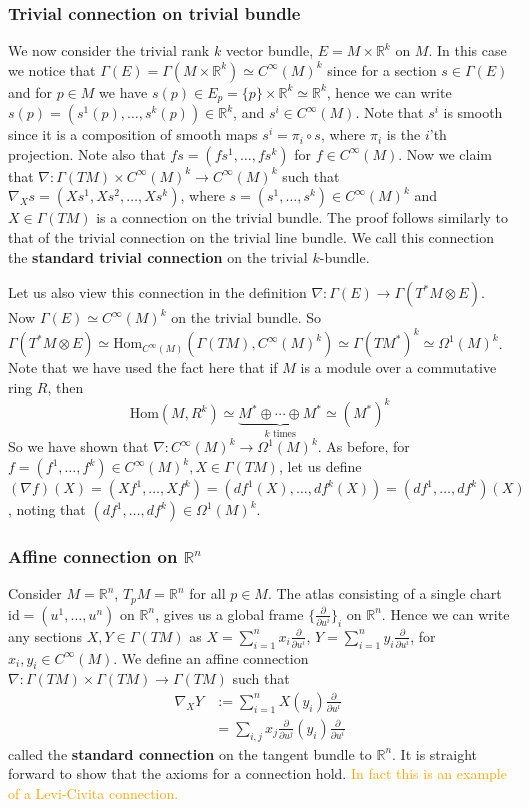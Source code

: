 \documentclass[a4paper]{article}
\theoremstyle{definition} \newtheorem*{definition}{Definition}
\theoremstyle{definition} \newtheorem*{definitions}{Definitions}
\theoremstyle{plain} \newtheorem{theorem}{Theorem}[section]
\theoremstyle{plain} \newtheorem{proposition}[theorem]{Proposition}
\theoremstyle{plain} \newtheorem{corollary}[theorem]{Corollary}
\theoremstyle{plain} \newtheorem{lemma}[theorem]{Lemma}
\theoremstyle{plain} \newtheorem{example}[theorem]{Example}
\newcommand{\understandBetter}[1]{\textcolor{orange}{#1}}
\newcommand{\defn}[1]{\textbf{#1}}
\newcommand{\realnos}{\mathbb{R}}
\newcommand{\Hom}{\text{Hom}}
\newcommand{\smooth}{C^\infty}
\begin{document}
\subsubsection{Trivial connection on trivial bundle}
We now consider the trivial rank $k$ vector bundle, $E=M\times \realnos^k$ on $M$. In this case we notice that $\Gamma(E)=\Gamma(M\times \realnos^k)\simeq \smooth (M)^k$ since for a section $s\in \Gamma(E)$ and for $p\in M$ we have $s(p)\in E_p=\{p\}\times \realnos^k\simeq \realnos^k$, hence we can write $s(p)=(s^1(p),\ldots, s^k(p))\in \realnos^k$, and $s^i\in \smooth(M)$. Note that $s^i$ is smooth since it is a composition of smooth maps $s^i=\pi_i\circ s$, where $\pi_i$ is the $i$'th projection. Note also that $fs=(fs^1, \ldots, fs^k)$ for $f\in \smooth(M)$. Now we claim that $\nabla:\Gamma(TM)\times \smooth(M)^k\to \smooth(M)^k$ such that $\nabla_X s = (Xs^1, Xs^2, \ldots, Xs^k)$, where $s=(s^1, \ldots, s^k)\in \smooth (M)^k$ and $X\in \Gamma(TM)$ is a connection on the trivial bundle. The proof follows similarly to that of the trivial connection on the trivial line bundle. We call this connection the \defn{standard trivial connection} on the trivial $k$-bundle. 

Let us also view this connection in the definition $\nabla:\Gamma(E)\to \Gamma(T^*M\otimes E)$. Now $\Gamma(E)\simeq \smooth(M)^k$ on the trivial bundle. So  $\Gamma(T^*M\otimes E)\simeq \Hom_{\smooth(M)}(\Gamma(TM), \smooth(M)^k)\simeq \Gamma(TM^*)^k \simeq \Omega^1(M)^k$. Note that we have used the fact here that if $M$ is a module over a commutative ring $R$, then 
$$\Hom(M, R^k)\simeq \underbrace{M^*\oplus \cdots \oplus M^*}_{k \text{ times}} \simeq (M^*)^{k}$$
So we have shown that $\nabla:\smooth(M)^k\to \Omega^1(M)^k$. As before, for $f=(f^1, \ldots, f^k)\in \smooth(M)^k, X\in \Gamma(TM)$, let us define $(\nabla f)(X)=(Xf^1, \ldots, Xf^k)=(df^1(X), \ldots, df^k(X))=(df^1, \ldots, df^k)(X)$, noting that $(df^1, \ldots, df^k)\in \Omega^1(M)^k$.

\subsubsection{Affine connection on $\realnos^n$}
Consider $M=\realnos^n$, $T_pM=\realnos^n$ for all $p\in M$.
The atlas consisting of a single chart $\text{id}=(u^1, \ldots, u^n)$ on $\realnos^n$, gives us a global frame $\{\frac{\partial}{\partial u^i}\}_i$ on $\realnos^n$. Hence we can write any sections $X, Y\in \Gamma(TM)$ as $X=\sum_{i=1}^n x_i \frac{\partial}{\partial u^i}$, $Y=\sum_{i=1}^n y_i \frac{\partial}{\partial u^i}$, for $x_i, y_i \in \smooth(M)$. We define an affine connection $\nabla:\Gamma(TM)\times \Gamma(TM)\to \Gamma(TM)$ such that 
\begin{align*}
\nabla_X Y & := \sum_{i=1}^n X(y_i) \frac{\partial}{\partial u^i} \\
& = \sum_{i, j} x_j\frac{\partial}{\partial u^j}(y_i)\frac{\partial}{\partial u^i}
\end{align*}
called the \defn{standard connection} on the tangent bundle to $\realnos^n$. It is straight forward to show that the axioms for a connection hold. \understandBetter{In fact this is an example of a Levi-Civita connection.}
\end{document}
